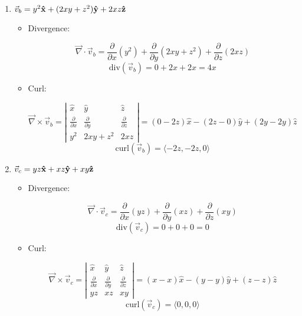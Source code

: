 \begin{enumerate}
\begin{enumerate}
\begin{itemize}
        \end{itemize}

      \item $\vec{v}_b=y^2\bold{\hat{x}}+(2xy+z^2)\bold{\hat{y}}+2xz\bold{\hat{z}}$

        \begin{itemize}

          \item Divergence:

            $$\vec{\nabla}\cdot\vec{v}_b=\frac{\partial}{\partial x}(y^2)+\frac{\partial}{\partial y}(2xy+z^2)+\frac{\partial}{\partial z}(2xz)$$
            $$\boxed{\text{div}(\vec{v}_b)=0+2x+2x=4x}$$

          \item Curl:

            $$\vec{\nabla}\times\vec{v}_b=\left|\begin{matrix} \hat{x} & \hat{y} & \hat{z}\\ \frac{\partial}{\partial x} & \frac{\partial}{\partial y} & \frac{\partial}{\partial z} \\ y^2 & 2xy+z^2 & 2xz \end{matrix}\right|=(0-2z)\hat{x}-(2z-0)\hat{y}+(2y-2y)\hat{z}$$
            $$\boxed{\text{curl}(\vec{v}_b)=\langle -2z, -2z, 0\rangle}$$

        \end{itemize}

      \item $\vec{v}_c=yz\bold{\hat{x}}+xz\bold{\hat{y}}+xy\bold{\hat{z}}$

        \begin{itemize}

          \item Divergence:

            $$\vec{\nabla}\cdot\vec{v}_c=\frac{\partial}{\partial x}(yz)+\frac{\partial}{\partial y}(xz)+\frac{\partial}{\partial z}(xy)$$
            $$\boxed{\text{div}(\vec{v}_c)=0+0+0=0}$$

          \item Curl:

            $$\vec{\nabla}\times\vec{v}_c=\left|\begin{matrix} \hat{x} & \hat{y} & \hat{z}\\ \frac{\partial}{\partial x} & \frac{\partial}{\partial y} & \frac{\partial}{\partial z} \\ yz & xz & xy \end{matrix}\right|=(x-x)\hat{x}-(y-y)\hat{y}+(z-z)\hat{z}$$
            $$\boxed{\text{curl}(\vec{v}_c)=\langle 0, 0, 0\rangle}$$


\end{itemize}
\end{enumerate}
\end{enumerate}
